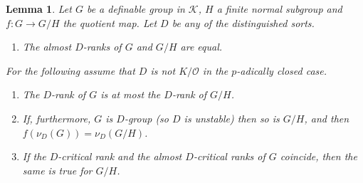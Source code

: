 \documentclass[11pt]{amsart}
\newtheorem{lemma}[theorem]{Lemma}
\theoremstyle{definition}
\newcommand{\CK}{{\mathcal K}}
\newcommand{\CO}{{\mathcal O}}
\newcommand{\0}{\emptyset}
\begin{document}
\begin{lemma}\label{L:passage of D-group under finite-to-one}
Let $G$ be a definable group in $\CK$, $H$ a finite normal subgroup and $f:G\to G/H$ the quotient map. Let $D$ be any of the distinguished sorts.


\begin{enumerate}
    \item The almost $D$-ranks of $G$ and $G/H$ are equal.

\end{enumerate}

 For the following assume that $D$ is not $K/\CO$ in the $p$-adically closed case.
\begin{enumerate}
    \item[(2)] The $D$-rank of $G$ is at most the $D$-rank of $G/H$. 
    
    \item[(3)] If, furthermore, $G$ is $D$-group (so $D$ is unstable) then so is $G/H$, and then $f(\nu_{D}(G))=\nu_{D}(G/H)$.
    \item[(4)] If the $D$-critical rank  and the almost $D$-critical ranks of $G$ coincide, then the same is true for $G/H$.
\end{enumerate}
\end{lemma}
\end{document}
